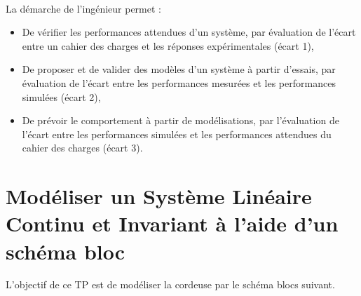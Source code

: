 
%



 \\

\graphicspath{{../../img/}}
\begin{center}
\def\svgwidth{\columnwidth}

\end{center}

La démarche de l’ingénieur permet :
\begin{itemize}
 \item De vérifier les performances attendues d’un système, par évaluation de l’écart entre un cahier des charges et les réponses expérimentales (écart 1),
 \item De proposer et de valider des modèles d’un système à partir d’essais, par évaluation de l’écart entre les performances mesurées et les performances simulées (écart 2),
 \item De prévoir le comportement à partir de modélisations, par l’évaluation de l’écart entre les performances simulées et les performances attendues du cahier des charges (écart 3).
\end{itemize}


\newpage

\section{Modéliser un Système Linéaire Continu et Invariant à l'aide d'un schéma bloc} 


L'objectif de ce TP est de modéliser la cordeuse par le schéma blocs suivant.

\graphicspath{{"../../Systemes/\systemes/"}}

\begin{center}
\def\svgwidth{\columnwidth}

\end{center}

